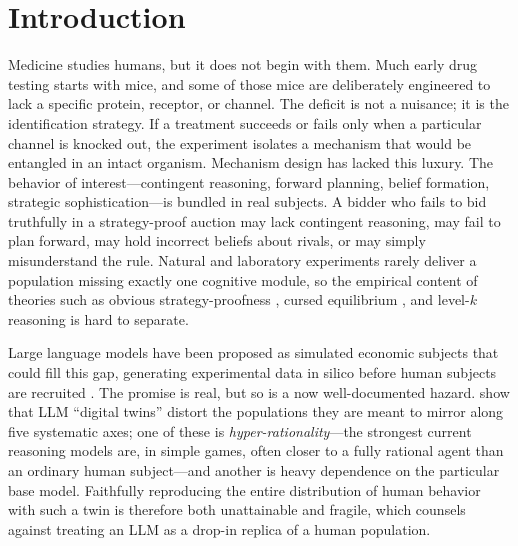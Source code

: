 \documentclass[12pt]{article}
\begin{document}
\begin{abstract}
\vspace{0.6em}
\noindent\textit{Keywords:} bounded rationality, mechanism design, second-price
auctions, large language models, construct validity, integrative experiments.
\end{abstract}

\section{Introduction}
\label{sec:intro}

Medicine studies humans, but it does not begin with them. Much early drug
testing starts with mice, and some of those mice are deliberately engineered to
lack a specific protein, receptor, or channel. The deficit is not a nuisance; it
is the identification strategy. If a treatment succeeds or fails only when a
particular channel is knocked out, the experiment isolates a mechanism that would
be entangled in an intact organism. Mechanism design has lacked this luxury. The
behavior of interest---contingent reasoning, forward planning, belief formation,
strategic sophistication---is bundled in real subjects. A bidder who fails to bid
truthfully in a strategy-proof auction may lack contingent reasoning, may fail to
plan forward, may hold incorrect beliefs about rivals, or may simply misunderstand
the rule. Natural and laboratory experiments rarely deliver a population missing
exactly one cognitive module, so the empirical content of theories such as
obvious strategy-proofness \citep{li2017}, cursed equilibrium
\citep{eysterrabin2005}, and level-$k$ reasoning \citep{crawfordiriberri2007} is
hard to separate.

Large language models have been proposed as simulated economic subjects that
could fill this gap, generating experimental data in silico before human subjects
are recruited \citep{horton2023large,manning2024automated}. The promise is real,
but so is a now well-documented hazard. \citet{peng2025funhouse} show that
LLM ``digital twins'' distort the populations they are meant to mirror along five
systematic axes; one of these is \emph{hyper-rationality}---the strongest current
reasoning models are, in simple games, often closer to a fully rational agent than
an ordinary human subject---and another is heavy dependence on the particular base
model. Faithfully reproducing the entire distribution of human behavior with such
a twin is therefore both unattainable and fragile, which counsels against treating
an LLM as a drop-in replica of a human population.
\end{document}
